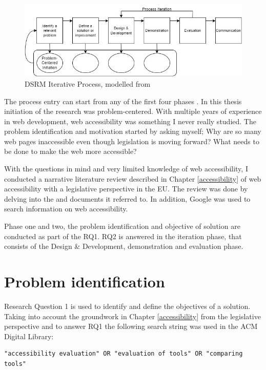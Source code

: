 \begin{figure}
    \centering
    \includegraphics[width=1\linewidth]{image.png}
    \caption{DSRM Iterative Process, modelled from \textcite{iterativedesignscience}}
    \label{fig:design-science}
\end{figure}

The process entry can start from any of the first four phases \citep{iterativedesignscience}. In this thesis initiation of the research was problem-centered. With multiple years of experience in web development, web accessibility was something I never really studied. The problem identification and motivation started by asking myself; Why are so many web pages inaccessible even though legislation is moving forward? What needs to be done to make the web more accessible? 

With the questions in mind and very limited knowledge of web accessibility, I conducted a narrative literature review described in Chapter \ref{accessibility} of web accessibility with a legislative perspective in the EU. The review was done by delving into the \textcite{eudirective2016} and documents it referred to. In addition, Google was used to search information on web accessibility.

Phase one and two, the problem identification and objective of solution are conducted as part of the RQ1. RQ2 is answered in the iteration phase, that consists of the Design \& Development, demonstration and evaluation phase.

\section{Problem identification}

Research Question 1 is used to identify and define the objectives of a solution. Taking into account the groundwork in Chapter \ref{accessibility} from the legislative perspective and to answer RQ1 the following search string was used in the ACM Digital Library:

\begin{verbatim}
"accessibility evaluation" OR "evaluation of tools" OR "comparing tools"
\end{verbatim}

